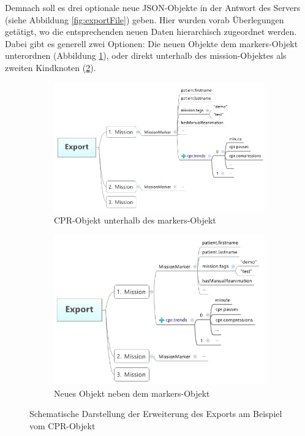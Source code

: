 Demnach soll es drei optionale neue JSON-Objekte in der Antwort des Servers (siehe Abbildung \ref{fig:exportFile}) geben.
Hier wurden vorab Überlegungen getätigt, wo die entsprechenden neuen Daten hierarchisch zugeordnet werden.
Dabei gibt es generell zwei Optionen:
Die neuen Objekte dem \glqq markers\grqq-Objekt unterordnen (Abbildung \ref{fig:marker}), oder direkt unterhalb des \glqq mission\grqq-Objektes als zweiten Kindknoten (\ref{fig:mission}).

\begin{figure}[ht]
\begin{subfigure}{.5\linewidth}
  \centering
  \includegraphics[width=.95\linewidth]{img/format1}  
  \caption{CPR-Objekt unterhalb des \glqq markers\grqq-Objekt}
  \label{fig:marker}
\end{subfigure}
\begin{subfigure}{.5\linewidth}
  \centering
  \includegraphics[width=.95\linewidth]{img/format2}  
  \caption{Neues Objekt neben dem \glqq markers\grqq-Objekt}
  \label{fig:mission}
\end{subfigure}
\caption[Beispiel einer Anfrage und Antwort der POST-Methode]{Schematische Darstellung der Erweiterung des Exports am Beispiel vom CPR-Objekt}
\label{fig:tree}
\end{figure}

